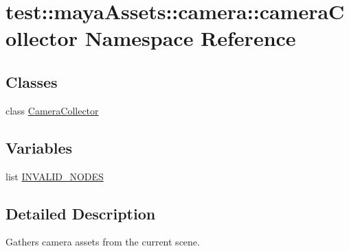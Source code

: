 \hypertarget{namespacetest_1_1mayaAssets_1_1camera_1_1cameraCollector}{\section{test\-:\-:maya\-Assets\-:\-:camera\-:\-:camera\-Collector \-Namespace \-Reference}
\label{da/d7c/namespacetest_1_1mayaAssets_1_1camera_1_1cameraCollector}
}
\subsection*{\-Classes}
\begin{DoxyCompactItemize}
\item 
class \hyperlink{classtest_1_1mayaAssets_1_1camera_1_1cameraCollector_1_1CameraCollector}{\-Camera\-Collector}
\end{DoxyCompactItemize}
\subsection*{\-Variables}
\begin{DoxyCompactItemize}
\item 
list \hyperlink{namespacetest_1_1mayaAssets_1_1camera_1_1cameraCollector_ac313094b5e6b4be3b744f8fb11511aa6}{\-I\-N\-V\-A\-L\-I\-D\-\_\-\-N\-O\-D\-E\-S}
\end{DoxyCompactItemize}


\subsection{\-Detailed \-Description}
\begin{DoxyVerb}
Gathers camera assets from the current scene.
\end{DoxyVerb}
 


